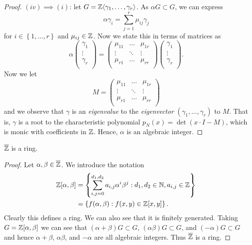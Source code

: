 \begin{proof}
	$(iv) \implies (i)$: let
	$G = \mathbb{Z} \langle \gamma_1, \ldots, \gamma_r \rangle$.
	As $\alpha G \subset G$,
	we can express
	\[
		\alpha \gamma_i = \sum^{r}_{j=1} \mu_{ij} \gamma_j
	\]
	for $i \in \left\{ 1, \ldots, r \right\}$ and $\mu_{ij} \in \mathbb{Z}$.
	Now we state this in terms of matrices as
	\[
		\alpha
		\begin{pmatrix}
			\gamma_1 \\
			\vdots \\
			\gamma_r \\
		\end{pmatrix}
		=
		\begin{pmatrix}
			\mu_{11} & \ldots & \mu_{1r} \\
			\vdots & \ddots & \vdots \\
			\mu_{r1} & \ldots & \mu_{rr} \\ 
		\end{pmatrix}
		\begin{pmatrix}
			\gamma_1 \\ 
			\vdots \\
			\gamma_r \\
		\end{pmatrix}
		.
	\]
	Now we let
	\[
		M =
		\begin{pmatrix}
			\mu_{11} & \ldots & \mu_{1r} \\
			\vdots & \ddots & \vdots \\
			\mu_{r1} & \ldots & \mu_{rr} \\ 
		\end{pmatrix}
	\]
	and we observe that $\gamma$ is an \emph{eigenvalue}
	to the \emph{eigenvector} $(\gamma_1, \ldots, \gamma_r)$
	to $M$.
	That is, $\gamma$ is a root to the characteristic polynomial
	$p_N(x) = \det(x \cdot I - M)$, which is monic with coefficients in $\mathbb{Z}$.
	Hence, $\alpha$ is an algebraic integer.
\end{proof}

\begin{corollary}
	$\overline{\mathbb{Z}}$ is a ring.
\end{corollary}

\begin{proof}
	Let $\alpha, \beta \in \overline{\mathbb{Z}}$.
	We introduce the notation
	\begin{align*}
		\mathbb{Z}[\alpha, \beta]
		&= \left\{ \sum_{i,j = 0}^{d_1,d_2} a_{i,j} \alpha^i \beta^j:
		d_1,d_2 \in \mathbb{N}, a_{i,j} \in \mathbb{Z} \right\} \\
		&= \left\{ f(\alpha, \beta) : f(x,y) \in \mathbb{Z}[x,y] \right\}.
	\end{align*}
	Clearly this defines a ring.
	We can also see that it is finitely generated.
	Taking $G = \mathbb{Z}[\alpha, \beta]$ we can see that
	$(\alpha + \beta) G \subset G$, $(\alpha\beta)G \subset G$,
	and $(-\alpha)G \subset G$ and hence $\alpha + \beta$,
	$\alpha\beta$, and $-\alpha$ are all algebraic integers.
	Thus $\overline{\mathbb{Z}}$ is a ring.
\end{proof}



